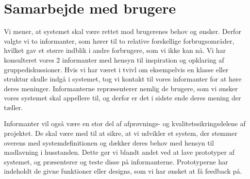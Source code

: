 

\section{Samarbejde med brugere}
\label{sec:samarbejde}

Vi mener, at systemet skal være rettet mod brugerenes behov og ønsker. Derfor valgte vi to informanter, som hører til to relative forskellige forbrugsområder, hvilket gav et større indblik i andre forbrugere, som vi ikke kan nå. Vi har konsulteret vores 2 informanter med hensyn til inspiration og opklaring af gruppediskussioner. Hvis vi har været i tvivl om eksempelvis en klasse eller struktur skulle indgå i systemet, tog vi kontakt til vores informanter for at høre deres meninger. Informanterne repræsenterer nemlig de brugere, som vi ønsker vores systemet skal appellere til, og derfor er det i sidste ende deres mening der tæller.

Informanter vil også være en stor del af afprøvnings- og kvalitetssikringsdelene af projektet. De skal være med til at sikre, at vi udvikler et system, der stemmer overens med systemdefinitionen og dækker deres behov med hensyn til madlavning i husstanden. Dette gør vi blandt andet ved at lave prototyper af systemet, og præsenterer og teste disse på informanterne. Prototyperne har indeholdt de givne funktioner eller designs, som vi har ønsket at få feedback på.